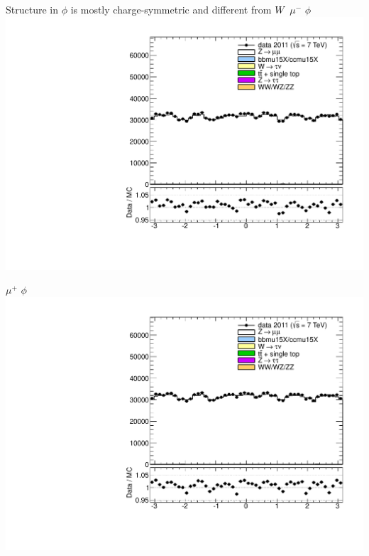 {
\centering
Structure in $\phi$ is mostly charge-symmetric and different from $W$
\newline
\colb[T]
\centering
$\mu^-$ $\phi$ \\
\includegraphics[width=1.0\textwidth]{dates/20121119/figures/zplots/lN_phi_nomatch.pdf}

\centering
$\mu^+$ $\phi$ \\
\includegraphics[width=1.0\textwidth]{dates/20121119/figures/zplots/lP_phi_nomatch.pdf}
\cole
}
